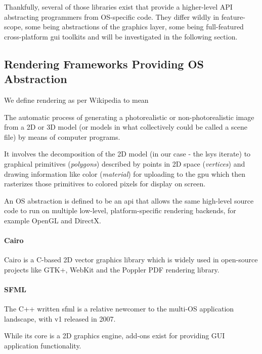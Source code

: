 Thankfully, several of those libraries exist that provide a higher-level API abstracting programmers from OS-specific code. They differ wildly in feature-scope, some being abstractions of the graphics layer, some being full-featured cross-platform \gls{gui} toolkits and will be investigated in the following section.

\subsection{Rendering Frameworks Providing OS Abstraction}
\label{sec:res_frameworks}

We define rendering as per Wikipedia to mean
\begin{definition}[Rendering]
The automatic process of generating a photorealistic or non-photorealistic image from a 2D or 3D model (or models in what collectively could be called a scene file) by means of computer programs.
\end{definition}
It involves the decomposition of the 2D model (in our case - the \gls{lsys} iterate) to graphical primitives (\textit{polygons}) described by points in 2D space (\textit{vertices}) and drawing information like color (\textit{material}) for uploading to the \gls{gpu} which then rasterizes those primitives to colored pixels for display on screen.

An OS abstraction is defined to be an \gls{api} that allows the same high-level source code to run on multiple low-level, platform-specific rendering backends, for example OpenGL and DirectX.

\paragraph{Cairo}
\label{sec:cairo}
Cairo is a C-based 2D vector graphics library which is widely used in open-source projects like GTK+, WebKit and the Poppler PDF rendering library.

\paragraph{SFML}
The C++ written \gls{sfml} is a relative newcomer to the multi-OS application landscape, with v1 released in 2007.

While its core is a 2D graphics engine, add-ons exist for providing GUI application functionality.  

